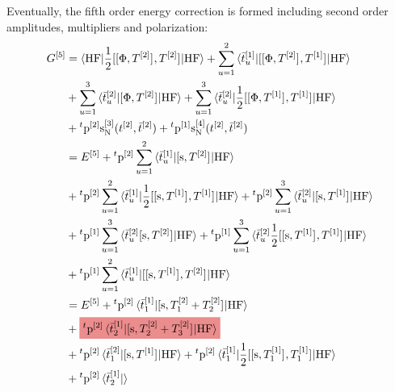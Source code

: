 Eventually, the fifth order energy correction is formed including second order
amplitudes, multipliers and polarization:
\begin{equation}\label{eq:pted-mbpt-5th}
  \begin{aligned}
    G^{[5]} &=
    \braket{\mathrm{HF} | \frac{1}{2}
    \commutator{\commutator{\Phi}{T^{[2]}}}{T^{[2]}}
    | \mathrm{HF}}
    +
    \sum_{u=1}^2\braket{\tbar{u}^{[1]}|
    \commutator{\commutator{\Phi}{T^{[2]}}}{T^{[1]}}
    | \mathrm{HF}}
    \\
    &+
    \sum_{u=1}^3\braket{\tbar{u}^{[2]}|
      \commutator{\Phi}{T^{[2]}}
    | \mathrm{HF}}
    +
    \sum_{u=1}^3\braket{\tbar{u}^{[2]}|
    \frac{1}{2}
    \commutator{\commutator{\Phi}{T^{[1]}}}{T^{[1]}}
    | \mathrm{HF}} \\
    &+ {}^t\p^{[2]}\s_{\mathrm{N}}^{[3]}(\tamp{}^{[2]}, \tbar{}^{[2]})
    + {}^t\p^{[1]}\s_{\mathrm{N}}^{[4]}(\tamp{}^{[2]}, \tbar{}^{[2]}) \\
    &= E^{[5]}
    + {}^t\p^{[2]}
    \sum_{u=1}^2\braket{\tbar{u}^{[1]} |
    \commutator{\s}{T^{[2]}} | \mathrm{HF}} \\
    &+ {}^t\p^{[2]}
    \sum_{u=1}^2\braket{\tbar{u}^{[1]} |
    \frac{1}{2}\commutator{\commutator{\s}{T^{[1]}}}{T^{[1]}}
    | \mathrm{HF}}
    + {}^t\p^{[2]}
    \sum_{u=1}^3\braket{ \tbar{u}^{[2]}
                                 | \commutator{\s}{T^{[1]}} | \mathrm{HF}}
    \\
    &+ {}^t\p^{[1]}
    \sum_{u=1}^3\braket{ \tbar{u}^{[2]}
    \commutator{\s}{T^{[2]}} | \mathrm{HF}}
    + {}^t\p^{[1]}
    \sum_{u=1}^3\braket{ \tbar{u}^{[2]}
    \frac{1}{2}\commutator{\commutator{\s}{T^{[1]}}}{T^{[1]}}
    | \mathrm{HF}} \\
    &+ {}^t\p^{[1]}
    \sum_{u=1}^2\braket{\tbar{u}^{[1]} |
    \commutator{\commutator{\s}{T^{[1]}}}{T^{[2]}}
    | \mathrm{HF}}
    \\
  &= E^{[5]}
    + {}^t\p^{[2]}\braket{\tbar{1}^{[1]} | \commutator{\s}{T_1^{[2]} +
    T_2^{[2]}} | \mathrm{HF}} \\
    &+ \highlight{brewerRed}{
    {}^t\p^{[2]}\braket{\tbar{2}^{[1]} | \commutator{\s}{T_2^{[2]} + T_3^{[2]}} | \mathrm{HF}}
    } \\
    &+ {}^t\p^{[2]}\braket{\tbar{1}^{[2]} | \commutator{\s}{T^{[1]}} | \mathrm{HF}}
    + {}^t\p^{[2]}
    \braket{\tbar{1}^{[1]} |
    \frac{1}{2}\commutator{\commutator{\s}{T_1^{[1]}}}{T_1^{[1]}}
    | \mathrm{HF}} \\
    &+ {}^t\p^{[2]}
    \braket{\tbar{2}^{[1]} |
}
\end{aligned}
\end{equation}
